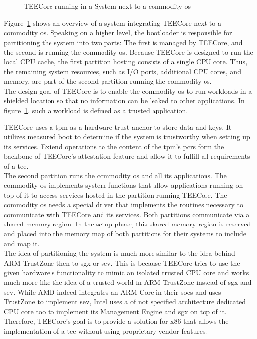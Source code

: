\label{sec:30:system_overview}
\begin{figure}
    \begin{center}
        
        \caption{TEECore running in a System next to a commodity \gls{os}}
        \label{fig:30:tee_system_design}
    \end{center}
\end{figure}

Figure~\ref{fig:30:tee_system_design} shows an overview of a system integrating
TEECore next to a commodity \gls{os}. Speaking on a higher level, the bootloader
is responsible for partitioning the system into two parts: The first is managed
by TEECore, and the second is running the commodity \gls{os}. Because TEECore is
designed to run the local CPU cache, the first partition hosting consists of a
single CPU core. Thus, the remaining system resources, such as I/O ports,
additional CPU cores, and memory, are part of the second partition running the
commodity \gls{os}.\\

The design goal of TEECore is to enable the commodity \gls{os} to run workloads
in a shielded location so that no information can be leaked to other
applications. In figure~\ref{fig:30:tee_system_design}, such a workload is
defined as a trusted application.

TEECore uses a \gls{tpm} as a hardware trust anchor to store data and keys. It
utilizes measured boot to determine if the system is trustworthy when setting up
its services. Extend operations to the content of the \gls{tpm}'s \glspl{pcr}
form the backbone of TEECore's attestation feature and allow it to fulfill all
requirements of a \gls{tee}.\\

The second partition runs the commodity \gls{os} and all its applications. The
commodity \gls{os} implements system functions that allow applications running
on top of it to access services hosted in the partition running TEECore. The
commodity \gls{os} needs a special driver that implements the routines necessary
to communicate with TEECore and its services. Both partitions communicate via a
shared memory region. In the setup phase, this shared memory region is reserved
and placed into the memory map of both partitions for their systems to include
and map it.\\

The idea of partitioning the system is much more similar to the idea behind ARM
TrustZone then to \gls{sgx} or \gls{sev}. This is because TEECore
tries to use the given hardware's functionality to mimic an isolated trusted CPU
core and works much more like the idea of a trusted world in ARM TrustZone
instead of \gls{sgx} and \gls{sev}. While AMD indeed integrates an ARM Core in
their \glspl{soc} and uses TrustZone to implement \gls{sev}, Intel uses a of not
specified architecture dedicated CPU core too to implement its Management
Engine and \gls{sgx} on top of it. Therefore, TEECore's goal is to provide a
solution for x86 that allows the implementation of a \gls{tee} without using
proprietary vendor features.

